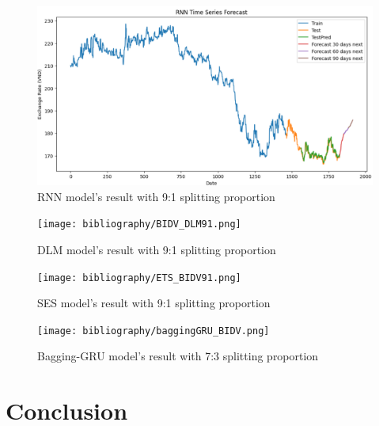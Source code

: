 \documentclass{ieeeojies}
\begin{document}
\begin{figure}[H]
  \centering
  \begin{minipage}{0.8\linewidth}
    \centering
    \includegraphics[width=\linewidth]{RNN_JPY.png}
    \caption{RNN model's result with 9:1 splitting proportion}
    \label{fig26}
  \end{minipage}
\end{figure}
\begin{figure}[H]
  \centering
  \begin{minipage}{0.8\linewidth}
    \centering
        \texttt{[image: bibliography/BIDV\_DLM91.png]}
    \caption{DLM model's result with 9:1 splitting proportion}
    \label{fig27}
  \end{minipage}
\end{figure}
\begin{figure}[H]
  \centering
  \begin{minipage}{0.8\linewidth}
    \centering
        \texttt{[image: bibliography/ETS\_BIDV91.png]}
    \caption{SES model's result with 9:1 splitting proportion}
    \label{fig28}
  \end{minipage}
\end{figure}
\begin{figure}[H]
  \centering
  \begin{minipage}{0.8\linewidth}
    \centering
        \texttt{[image: bibliography/baggingGRU\_BIDV.png]}
    \caption{Bagging-GRU model's result with 7:3 splitting proportion}
    \label{fig28}
  \end{minipage}
\end{figure}
\section{Conclusion}
\end{document}
